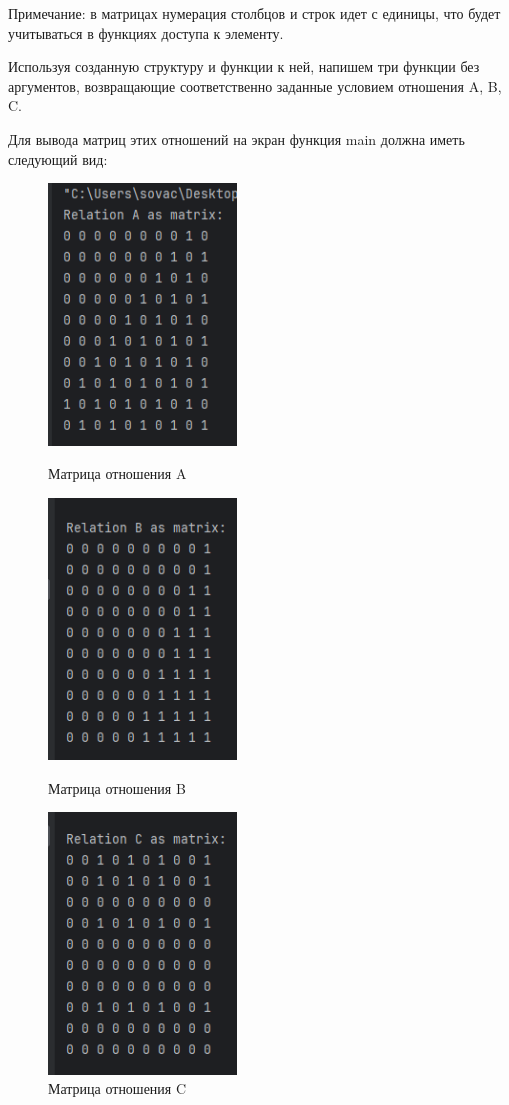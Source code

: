\documentclass[12pt]{article}
\begin{document}
	Примечание: в матрицах нумерация столбцов и строк идет с единицы, что будет учитываться в функциях доступа к элементу.
	
	 
	
	Используя созданную структуру и функции к ней, напишем три функции без аргументов, возвращающие соответственно заданные условием отношения A, B, C.
	
	 
	
	Для вывода матриц этих отношений на экран функция main должна иметь следующий вид:
	
	 
	
	\begin{figure}[h]
		\begin{multicols}{3}
			\includegraphics[width=50mm]{images/a_print.png}
			\caption{Матрица отношения A}
			\hfill
			\includegraphics[width=50mm]{images/b_print.png}
			\caption{Матрица отношения B}
			\hfill
			\includegraphics[width=50mm]{images/c_print.png}
			\caption{Матрица отношения C}
		\end{multicols}
	\end{figure}
	
\end{document}
